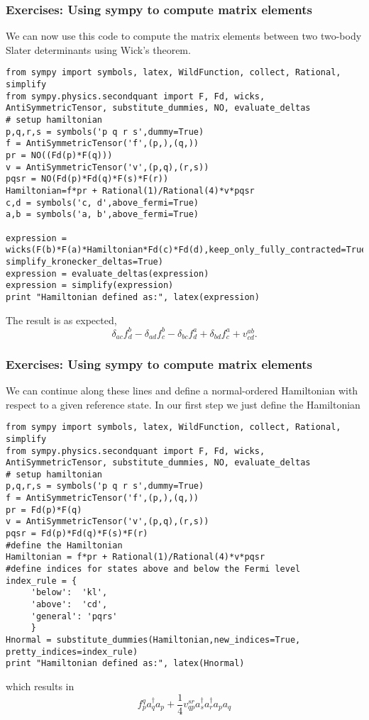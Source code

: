 \documentclass{beamer}
\begin{document}
\begin{frame}
\frametitle{Exercises: Using sympy to compute matrix elements}

\begin{block}{}
We can now use this code to compute the matrix elements between two two-body Slater determinants using Wick's theorem.
\begin{verbatim}
from sympy import symbols, latex, WildFunction, collect, Rational, simplify
from sympy.physics.secondquant import F, Fd, wicks, AntiSymmetricTensor, substitute_dummies, NO, evaluate_deltas
# setup hamiltonian
p,q,r,s = symbols('p q r s',dummy=True)
f = AntiSymmetricTensor('f',(p,),(q,))
pr = NO((Fd(p)*F(q)))
v = AntiSymmetricTensor('v',(p,q),(r,s))
pqsr = NO(Fd(p)*Fd(q)*F(s)*F(r))
Hamiltonian=f*pr + Rational(1)/Rational(4)*v*pqsr
c,d = symbols('c, d',above_fermi=True)
a,b = symbols('a, b',above_fermi=True)

expression = wicks(F(b)*F(a)*Hamiltonian*Fd(c)*Fd(d),keep_only_fully_contracted=True, simplify_kronecker_deltas=True)
expression = evaluate_deltas(expression)
expression = simplify(expression)
print "Hamiltonian defined as:", latex(expression)
\end{verbatim}
The result is as expected,
\[
\delta_{a c} f^{b}_{d} - \delta_{a d} f^{b}_{c} - \delta_{b c} f^{a}_{d} + \delta_{b d} f^{a}_{c} + v^{ab}_{cd}.
\]

\end{block}
\end{frame}

\begin{frame}
\frametitle{Exercises: Using sympy to compute matrix elements}

\begin{block}{}
We can continue along these lines and define a normal-ordered Hamiltonian with respect to a given reference state.
In our first step we just define the Hamiltonian
\begin{verbatim}
from sympy import symbols, latex, WildFunction, collect, Rational, simplify
from sympy.physics.secondquant import F, Fd, wicks, AntiSymmetricTensor, substitute_dummies, NO, evaluate_deltas
# setup hamiltonian
p,q,r,s = symbols('p q r s',dummy=True)
f = AntiSymmetricTensor('f',(p,),(q,))
pr = Fd(p)*F(q)
v = AntiSymmetricTensor('v',(p,q),(r,s))
pqsr = Fd(p)*Fd(q)*F(s)*F(r)
#define the Hamiltonian
Hamiltonian = f*pr + Rational(1)/Rational(4)*v*pqsr
#define indices for states above and below the Fermi level
index_rule = {
     'below':  'kl',
     'above':  'cd',
     'general': 'pqrs'
     }
Hnormal = substitute_dummies(Hamiltonian,new_indices=True, pretty_indices=index_rule)
print "Hamiltonian defined as:", latex(Hnormal)
\end{verbatim}
which results in
\[
f^{q}_{p} a^\dagger_{q} a_{p} + \frac{1}{4} v^{sr}_{qp} a^\dagger_{s} a^\dagger_{r} a_{p} a_{q}
\]
\end{block}
\end{frame}
\end{document}
